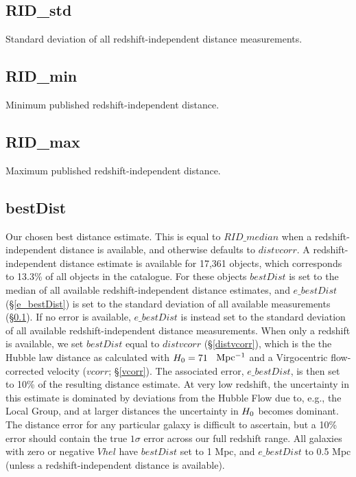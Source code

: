 \subsection{RID\_std} \label{RID_std}
Standard deviation of all redshift-independent distance measurements.

\subsection{RID\_min} \label{RID_min}
Minimum published redshift-independent distance.

\subsection{RID\_max} \label{RID_max}
Maximum published redshift-independent distance.

\subsection{bestDist} \label{bestDist}
Our chosen best distance estimate. This is equal to $RID\_median$ when a redshift-independent distance is available, and otherwise defaults to $distvcorr$. A redshift-independent distance estimate is available for 17,361 objects, which corresponds to 13.3\% of all objects in the catalogue. For these objects $bestDist$ is set to the median of all available redshift-independent distance estimates, and $e\_bestDist$ (\S \ref{e_bestDist}) is set to the standard deviation of all available measurements (\S \ref{RID_std}). If no error is available, $e\_bestDist$ is instead set to the standard deviation of all available redshift-independent distance measurements. When only a redshift is available, we set $bestDist$ equal to $distvcorr$ (\S \ref{distvcorr}), which is the the Hubble law distance as calculated with $H_{\rm 0} = 71$ \kms~$\rm Mpc^{-1}$ and a Virgocentric flow-corrected velocity ($vcorr$; \S \ref{vcorr}). The associated error, $e\_bestDist$, is then set to 10\% of the resulting distance estimate. At very low redshift, the uncertainty in this estimate is dominated by deviations from the Hubble Flow due to, e.g., the Local Group, and at larger distances the uncertainty in $H_{\rm 0}$ becomes dominant. The distance error for any particular galaxy is difficult to ascertain, but a 10\% error should contain the true $1\sigma$ error across our full redshift range. All galaxies with zero or negative $Vhel$ have $bestDist$ set to 1 Mpc, and $e\_bestDist$ to 0.5 Mpc (unless a redshift-independent distance is available). 

